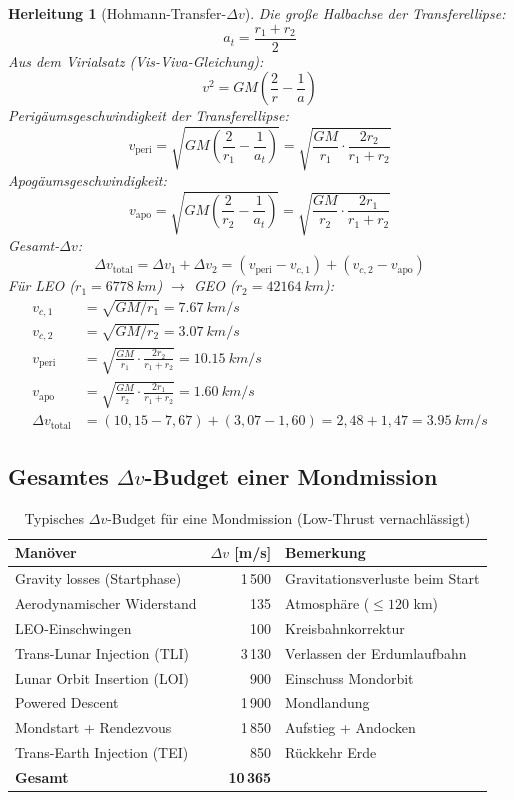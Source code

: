 ﻿\documentclass[12pt,a4paper]{article}
\newtheorem{herleitung}{Herleitung}[section]
\newcommand{\Dv}{\Delta v}
\begin{document}
\begin{herleitung}[Hohmann-Transfer-$\Dv$]
Die große Halbachse der Transferellipse:
\[
  a_t = \frac{r_1 + r_2}{2}
\]
Aus dem Virialsatz (Vis-Viva-Gleichung):
\[
  v^2 = GM\left(\frac{2}{r} - \frac{1}{a}\right)
\]
Perigäumsgeschwindigkeit der Transferellipse:
\[
  v_{\mathrm{peri}} = \sqrt{GM\left(\frac{2}{r_1} - \frac{1}{a_t}\right)}
  = \sqrt{\frac{GM}{r_1}\cdot\frac{2r_2}{r_1+r_2}}
\]
Apogäumsgeschwindigkeit:
\[
  v_{\mathrm{apo}} = \sqrt{GM\left(\frac{2}{r_2} - \frac{1}{a_t}\right)}
  = \sqrt{\frac{GM}{r_2}\cdot\frac{2r_1}{r_1+r_2}}
\]
Gesamt-$\Dv$:
\[
  \boxed{\Dv_{\mathrm{total}} = \Dv_1 + \Dv_2
    = \left(v_{\mathrm{peri}} - v_{c,1}\right)
    + \left(v_{c,2} - v_{\mathrm{apo}}\right)}
\]
Für LEO ($r_1 = \SI{6778}{km}$) $\to$ GEO ($r_2 = \SI{42164}{km}$):
\begin{align*}
  v_{c,1} &= \sqrt{GM/r_1} = \SI{7.67}{km/s}\\
  v_{c,2} &= \sqrt{GM/r_2} = \SI{3.07}{km/s}\\
  v_{\mathrm{peri}} &= \sqrt{\frac{GM}{r_1}\cdot\frac{2r_2}{r_1+r_2}}
    = \SI{10.15}{km/s}\\
  v_{\mathrm{apo}} &= \sqrt{\frac{GM}{r_2}\cdot\frac{2r_1}{r_1+r_2}}
    = \SI{1.60}{km/s}\\
  \Dv_{\mathrm{total}} &= (10{,}15 - 7{,}67) + (3{,}07 - 1{,}60)
    = 2{,}48 + 1{,}47 = \SI{3.95}{km/s}
\end{align*}
\end{herleitung}

\subsection{Gesamtes $\Dv$-Budget einer Mondmission}

\begin{table}[H]
\centering
\caption{Typisches $\Dv$-Budget für eine Mondmission (Low-Thrust vernachlässigt)}
\label{tab:dv_mond}
\begin{tabular}{lrl}
\toprule
\textbf{Manöver} & \textbf{$\Dv$ [m/s]} & \textbf{Bemerkung}\\
\midrule
Gravity losses (Startphase)       & 1\,500 & Gravitationsverluste beim Start\\
Aerodynamischer Widerstand        &   135  & Atmosphäre ($\leq 120$ km)\\
LEO-Einschwingen                  &   100  & Kreisbahnkorrektur\\
Trans-Lunar Injection (TLI)       & 3\,130 & Verlassen der Erdumlaufbahn\\
Lunar Orbit Insertion (LOI)       &   900  & Einschuss Mondorbit\\
Powered Descent                   & 1\,900 & Mondlandung\\
Mondstart + Rendezvous            & 1\,850 & Aufstieg + Andocken\\
Trans-Earth Injection (TEI)       &   850  & Rückkehr Erde\\
\midrule
\textbf{Gesamt}                   & \textbf{10\,365} & \\
\bottomrule
\end{tabular}
\end{table}
\end{document}
